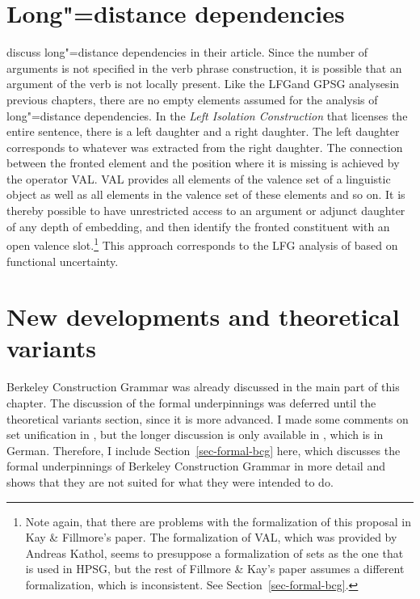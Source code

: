 \section{Long"=distance dependencies}

\mbox{}\citet[Section~3.10]{KF99a} discuss long"=distance dependencies in their article.
Since the number of arguments is not specified in the verb phrase construction, it is possible that an argument of the verb is not locally
present. Like the LFG\indexlfg and GPSG analyses\indexgpsg in previous chapters, there are no empty elements assumed
for the analysis of long"=distance dependencies.
 In the \emph{Left Isolation Construction} that licenses the entire sentence, there is a left daughter and a right daughter.
 The left daughter corresponds to whatever was extracted from the right daughter. The connection between the fronted element
 and the position where it is missing is achieved by the operator VAL.
 VAL provides all elements of the valence set of a linguistic object as well as all elements in the valence set of these elements and so on.
 It is thereby possible to have unrestricted access to an argument or adjunct daughter of any depth of embedding, and then identify the fronted
 constituent with an open valence slot.\footnote{%
   Note again, that there are problems with the formalization of this proposal in Kay \& Fillmore's
   paper. The formalization of VAL, which was provided by Andreas Kathol, seems to presuppose a
   formalization of sets as the one that is used in HPSG, but the rest of Fillmore \& Kay's paper
   assumes a different formalization, which is inconsistent. See Section~\ref{sec-formal-bcg}.
 } This approach corresponds to the LFG analysis of \citet{KZ89a} based on functional uncertainty.%

\section{New developments and theoretical variants}

Berkeley Construction Grammar was already discussed in the main part of this chapter. The discussion
of the formal underpinnings was deferred until the theoretical variants section, since it is more
advanced. I made some comments on set unification in , but the longer
discussion is only available in , which is in
German. Therefore, I include Section~\ref{sec-formal-bcg} here, which discusses the formal
underpinnings of Berkeley Construction Grammar in more detail and shows that they are not suited for what they were intended to do.

